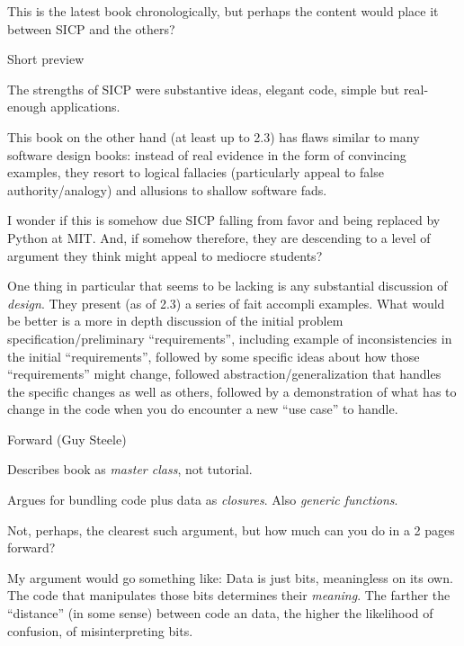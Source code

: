 \documentclass[11pt]{PalisadesLakesBook}
\begin{document}
\begin{plSection}{}
This is the latest book chronologically,
but perhaps the content would place it between SICP
and the others?
\begin{plSection}{Short preview}

The strengths of SICP were substantive ideas, elegant code,
simple but real-enough applications.

This book on the other hand (at least up to 2.3)
has flaws similar to many software design books:
instead of real evidence in the form of convincing examples,
they resort to logical fallacies (particularly appeal to
false authority/analogy)
and allusions to shallow software fads.

I wonder if this is somehow due SICP falling from favor
and being replaced by Python at MIT.
And, if somehow therefore, they are descending to a level of
argument they think might appeal to mediocre students?

One thing in particular that seems to be lacking is 
any substantial discussion of \emph{design}.
They present (as of 2.3) a series of fait accompli examples.
What would be better is a more in depth discussion 
of the initial problem specification/preliminary ``requirements'',
including example of inconsistencies 
in the initial ``requirements'',
followed by some specific ideas about how those ``requirements''
might change,
followed abstraction/generalization that handles the specific
changes as well as others,
followed by a demonstration of what has to change in the code
when you do encounter a new ``use case'' to handle.

\end{plSection}%
\begin{plSection}{Forward (Guy Steele)}

Describes book as \emph{master class}, not tutorial.

Argues for bundling code plus data as \emph{closures}. 
Also \emph{generic functions}.

Not, perhaps, the clearest such argument, but how much can you do
in a 2 pages forward?

My argument would go something like:
Data is just bits, meaningless on its own.
The code that manipulates those bits determines their 
\emph{meaning}.
The farther the ``distance'' (in some sense) 
between code an data, 
the higher the likelihood of confusion,
of misinterpreting bits. 


\end{plSection}
\end{plSection}
\end{document}
